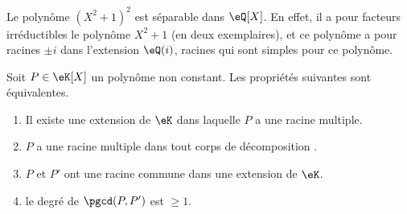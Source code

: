 \begin{example}
	Le polynôme \( (X^2+1)^2\) est séparable dans \( \eQ[X]\). En effet, il a pour facteurs irréductibles le polynôme \( X^2+1\) (en deux exemplaires), et ce polynôme a pour racines \( \pm i\) dans l'extension \( \eQ(i)\), racines qui sont simples pour ce polynôme.
\end{example}

\begin{proposition}  \label{PropolyeZff}
	Soit \( P\in \eK[X]\) un polynôme non constant. Les propriétés suivantes sont équivalentes.
	\begin{enumerate}
		\item\label{ItemdqPFUi}
		      Il existe une extension de \( \eK\) dans laquelle \( P\) a une racine multiple.
		\item\label{ItemdqPFUib}
		      \( P\) a une racine multiple dans tout corps de décomposition .
		\item\label{ItemdqPFUii}
		      \( P\) et \( P'\) ont une racine commune dans une extension de \( \eK\).
		\item\label{ItemdqPFUiii}
		      le degré de \( \pgcd(P,P')\) est \( \geq 1\).
	\end{enumerate}
\end{proposition}

